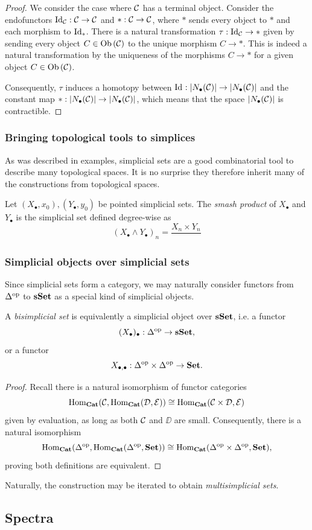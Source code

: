 \begin{proof}
    We consider the case where $\CC$ has a terminal object. Consider the endofunctors $\Id{\CC} : \CC \to \CC$ and $* : \CC \to \CC$, where $*$ sends every object to $*$ and each morphism to $\Id{*}$. There is a natural transformation $\tau : \Id{\CC} \to *$ given by sending every object $C \in \Ob{\CC}$ to the unique morphism $C \to *$. This is indeed a natural transformation by the uniqueness of the morphisms $C \to *$ for a given object $C \in \Ob{\CC}$. 
    
    Consequently, $\tau$ induces a homotopy between $\Id{} : \abs{N_{\bullet}(\CC)} \to \abs{N_{\bullet}(\CC)}$ and the constant map $* : \abs{N_{\bullet}(\CC)} \to \abs{N_{\bullet}(\CC)}$, which means that the space $\abs{N_{\bullet}(\CC)}$ is contractible.
\end{proof}

\subsubsection{Bringing topological tools to simplices}
As was described in examples, simplicial sets are a good combinatorial tool to describe many topological spaces. It is no surprise they therefore inherit many of the constructions from topological spaces.

\begin{definition}
    Let $(X_\bullet, x_0), (Y_\bullet, y_0)$ be pointed simplicial sets. The \emph{smash product} of $X_\bullet$ and $Y_\bullet$ is the simplicial set defined degree-wise as
    \[ (X_\bullet \wedge Y_\bullet)_n = \frac{X_n \times Y_n}{} \]
\end{definition}

\subsubsection{Simplicial objects over simplicial sets}
Since simplicial sets form a category, we may naturally consider functors from $\op{\Delta}$ to $\sSet$ as a special kind of simplicial objects.

\begin{propdef}
    A \emph{bisimplicial set} is equivalently a simplicial object over $\sSet$, i.e. a functor
    \[ (X_\bullet)_\bullet : \op{\Delta} \to \sSet, \]
    or a functor
    \[ X_{\bullet, \bullet} : \op{\Delta} \times \op{\Delta} \to \Set. \]
\end{propdef}
\begin{proof}
Recall there is a natural isomorphism of functor categories 
\[ \Hom[\Cat]{\CC}{\Hom[\Cat]{\DD}{\mathcal{E}}} \cong \Hom[\Cat]{\CC \times \DD}{\mathcal{E}} \]
given by evaluation, as long as both $\CC$ and $\DD$ are small. Consequently, there is a natural isomorphism
\[ \Hom[\Cat]{\op{\Delta}}{\Hom[\Cat]{\op{\Delta}}{\Set}} \cong \Hom[\Cat]{\op{\Delta} \times \op{\Delta}}{\Set}, \]
proving both definitions are equivalent.
\end{proof}

Naturally, the construction may be iterated to obtain \emph{multisimplicial sets}.

\subsection{Spectra}



